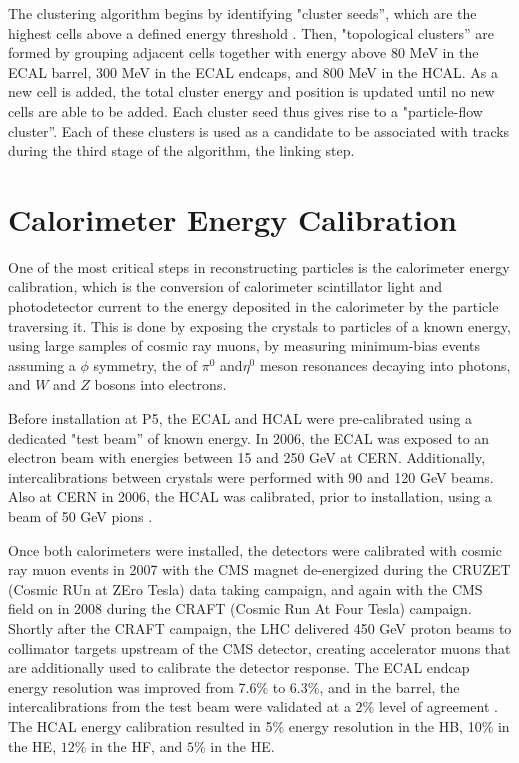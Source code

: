 \par The clustering algorithm begins by identifying "cluster seeds'',
which are the highest \PT cells above a defined energy threshold
\cite{CMS-PAS-PFT-09-001}.  Then, "topological clusters'' are formed
by grouping adjacent cells together with energy above 80 MeV in the
ECAL barrel, 300 MeV in the ECAL endcaps, and 800 MeV in the HCAL.
As a new cell is added, the total cluster energy and position is
updated until no new cells are able to be added.  Each cluster seed
thus gives rise to a "particle-flow cluster''.  Each of these clusters
is used as a candidate to be associated with tracks during the third
stage of the algorithm, the linking step.  


\section{Calorimeter Energy Calibration}
\label{energy_calibration_overview}

\par One of the most critical steps in reconstructing particles is the
calorimeter energy calibration, which is the conversion of calorimeter
scintillator light and photodetector current to the energy deposited
in the calorimeter by the particle traversing it.  This is done by
exposing the crystals to particles of a known energy, using large
samples of cosmic ray muons, by measuring minimum-bias events assuming
a $\phi$ symmetry, the of $\pi^{0}$ and$\eta^{0}$ meson resonances
decaying into photons, and $W$ and $Z$ bosons into electrons.   

\par Before installation at P5, the ECAL and HCAL were pre-calibrated
using a dedicated "test beam'' of known energy.  In 2006,
the ECAL was exposed to an electron beam with 
energies between 15 and 250 GeV \cite{Adzic:2008zza} at CERN.
Additionally, intercalibrations between crystals were performed with 90
and 120 GeV beams.  Also at CERN in 2006, the HCAL was calibrated,
prior to installation, using a beam of 50 GeV pions
\cite{Cankocak:1127315}. 

\par Once both calorimeters were installed, the detectors were
calibrated with cosmic ray muon events in 2007 with the CMS magnet
de-energized during the CRUZET (Cosmic RUn at ZEro Tesla) data taking
campaign, and again with the CMS field on in 2008 during the CRAFT
(Cosmic Run At Four Tesla) campaign.  Shortly after the CRAFT
campaign, the LHC delivered 450 GeV proton beams to collimator targets
upstream of the CMS detector, creating accelerator muons that are
additionally used to calibrate the detector response.  The ECAL endcap
energy resolution was improved from 7.6$\%$ to 6.3$\%$, and in the
barrel, the intercalibrations from the test beam were validated at a
$2\%$ level of agreement \cite{Malberti:1358839}.  The HCAL energy
calibration resulted in 5$\%$ energy resolution in the HB, 10$\%$ in
the HE, $12\%$ in the HF, and $5\%$ in the
HE\cite{Chatrchyan:1223950}.  

